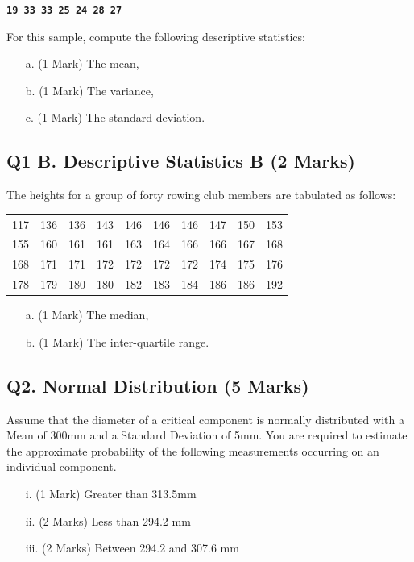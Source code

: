 \documentclass[a4paper,12pt]{article}
\begin{document}
\begin{center}
	\textbf{\texttt{19 33 33 25 24 28 27}}
\end{center}

\noindent For this sample, compute the following descriptive statistics:
\begin{itemize}
	\item[a.] (1 Mark) The mean,
	\item[b.] (1 Mark) The variance,
	\item[c.] (1 Mark) The standard deviation.
\end{itemize}

\subsection*{Q1 B. Descriptive Statistics B (2 Marks)} %
The heights for a group of forty rowing club members are tabulated as follows:

\begin{table}[ht]
	\begin{center}
		\begin{tabular}{|rrrrrrrrrr|}
			
			\hline
			117& 136& 136& 143& 146& 146& 146& 147& 150& 153\\
			155& 160& 161& 161& 163& 164& 166& 166& 167& 168\\
			168& 171& 171& 172& 172& 172& 172& 174& 175& 176\\
			178& 179& 180& 180& 182& 183& 184& 186& 186& 192\\
			\hline
		\end{tabular}
	\end{center}
\end{table}
\vspace{-0.5cm}
\begin{itemize}
	\item[a.] (1 Mark) The median,
	\item[b.] (1 Mark) The inter-quartile range.
\end{itemize}
\newpage
\subsection*{Q2. Normal Distribution (5 Marks)} %
Assume that the diameter of a critical component is normally distributed with a Mean of 300mm and a Standard Deviation of 5mm. You are required  to estimate the approximate probability of the following measurements occurring on an individual component.
\begin{itemize}
	\item [i.](1 Mark)	Greater than 313.5mm
	\item [ii.](2 Marks) Less than 294.2 mm
	\item [iii.](2 Marks) Between 294.2 and 307.6 mm
\end{itemize}
\bigskip
\end{document}

